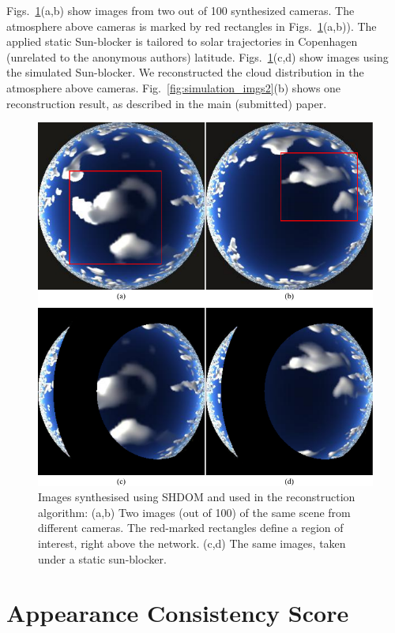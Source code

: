 \documentclass[runningheads]{llncs}
\begin{document}
Figs.~\ref{fig:simulation_imgs1}(a,b) show images from two out of 100
synthesized cameras. The atmosphere above cameras is marked by red rectangles in Figs.~\ref{fig:simulation_imgs1}(a,b)). The applied static Sun-blocker is tailored to solar trajectories in Copenhagen (unrelated to the anonymous authors) latitude. Figs.~\ref{fig:simulation_imgs1}(c,d) show images using the simulated Sun-blocker.
We reconstructed the cloud distribution in the atmosphere above cameras. Fig.~\ref{fig:simulation_imgs2}(b) shows one reconstruction result, as described in the main (submitted) paper.
\begin{figure}
  \begin{center}
    \includegraphics{figures/simulation_imgs}
    \caption{Images synthesised using SHDOM and used in the
      reconstruction algorithm: (a,b) Two images (out of 100) of the
      same scene from different cameras. The red-marked rectangles define
      a region of interest, right above the network. (c,d) The
      same images, taken under a static sun-blocker.}
    \label{fig:simulation_imgs1}
  \end{center}
\end{figure}


\section{Appearance Consistency Score}
\label{sec:appearancecore}
\end{document}
